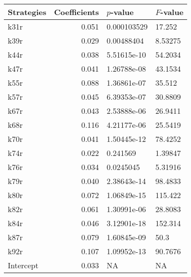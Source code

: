 \begin{tabular}{lrll}
\toprule
Strategies &  Coefficients &    $p$-value & $F$-value \\
\midrule
      k31r &         0.051 &  0.000103529 &    17.252 \\
      k39r &         0.029 &   0.00488404 &   8.53275 \\
      k44r &         0.038 &  5.51615e-10 &   54.2034 \\
      k47r &         0.041 &  1.26788e-08 &   43.1534 \\
      k55r &         0.088 &  1.36861e-07 &    35.512 \\
      k57r &         0.045 &  6.39353e-07 &   30.8809 \\
      k67r &         0.043 &  2.53888e-06 &   26.9411 \\
      k68r &         0.116 &  4.21177e-06 &   25.5419 \\
      k70r &         0.041 &  1.50445e-12 &   78.4252 \\
      k74r &         0.022 &     0.241569 &   1.39847 \\
      k76r &         0.034 &    0.0245045 &   5.31916 \\
      k79r &         0.040 &  2.38643e-14 &   98.4833 \\
      k80r &         0.072 &  1.06849e-15 &   115.422 \\
      k82r &         0.061 &  1.30991e-06 &   28.8083 \\
      k84r &         0.046 &  3.12901e-18 &   152.314 \\
      k87r &         0.079 &  1.60845e-09 &      50.3 \\
      k92r &         0.107 &  1.09952e-13 &   90.7676 \\
 Intercept &         0.033 &           NA &        NA \\
\bottomrule
\end{tabular}
